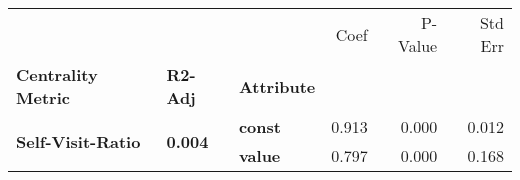 \begin{tabular}{lllrrr}
\toprule
                 &       &       &  Coef &  P-Value &  Std Err \\
\textbf{Centrality Metric} & \textbf{R2-Adj} & \textbf{Attribute} &       &          &          \\
\midrule
\multirow{2}{*}{\textbf{Self-Visit-Ratio}} & \multirow{2}{*}{\textbf{0.004}} & \textbf{const} & 0.913 &    0.000 &    0.012 \\
                 &       & \textbf{value} & 0.797 &    0.000 &    0.168 \\
\bottomrule
\end{tabular}
